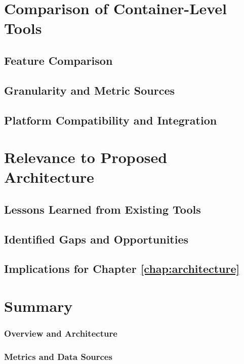 \section{Comparison of Container-Level Tools}
\label{sec:tool-comparison}
\subsection{Feature Comparison}
\label{sec:feature-comparison}
\subsection{Granularity and Metric Sources}
\label{sec:granularity-comparison}
\subsection{Platform Compatibility and Integration}
\label{sec:integration-comparison}

\section{Relevance to Proposed Architecture}
\label{sec:relevance-to-architecture}
\subsection{Lessons Learned from Existing Tools}
\label{sec:lessons-learned}
\subsection{Identified Gaps and Opportunities}
\label{sec:tool-gaps}
\subsection{Implications for Chapter \ref{chap:architecture}}
\label{sec:implications-architecture}

\section{Summary}
\label{sec:tool-summary}




\subsubsection{Overview and Architecture}
\subsubsection{Metrics and Data Sources}
